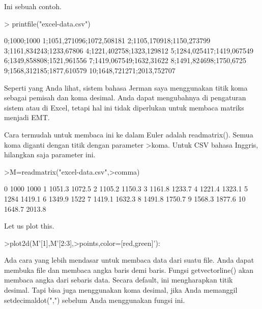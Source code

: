 \documentclass{article}
\begin{document}
\begin{eulernotebook}
\begin{eulercomment}
\begin{eulercomment}
\begin{eulercomment}
\begin{eulercomment}
\begin{eulercomment}
\begin{eulercomment}
\begin{eulercomment}
\begin{eulercomment}
\begin{eulercomment}
\begin{eulercomment}
\begin{eulercomment}
\begin{eulercomment}
\begin{eulercomment}
\begin{eulercomment}
\begin{eulercomment}
Ini sebuah contoh.
\end{eulercomment}
\begin{eulerprompt}
> printfile("excel-data.csv")
\end{eulerprompt}
\begin{euleroutput}
  0;1000;1000
  1;1051,271096;1072,508181
  2;1105,170918;1150,273799
  3;1161,834243;1233,67806
  4;1221,402758;1323,129812
  5;1284,025417;1419,067549
  6;1349,858808;1521,961556
  7;1419,067549;1632,31622
  8;1491,824698;1750,6725
  9;1568,312185;1877,610579
  10;1648,721271;2013,752707
\end{euleroutput}
\begin{eulercomment}
Seperti yang Anda lihat, sistem bahasa Jerman saya menggunakan titik
koma sebagai pemisah dan koma desimal. Anda dapat mengubahnya di
pengaturan sistem atau di Excel, tetapi hal ini tidak diperlukan untuk
membaca matriks menjadi EMT.

Cara termudah untuk membaca ini ke dalam Euler adalah readmatrix().
Semua koma diganti dengan titik dengan parameter \textgreater{}koma. Untuk CSV
bahasa Inggris, hilangkan saja parameter ini.
\end{eulercomment}
\begin{eulerprompt}
>M=readmatrix("excel-data.csv",>comma)
\end{eulerprompt}
\begin{euleroutput}
          0      1000      1000 
          1    1051.3    1072.5 
          2    1105.2    1150.3 
          3    1161.8    1233.7 
          4    1221.4    1323.1 
          5      1284    1419.1 
          6    1349.9      1522 
          7    1419.1    1632.3 
          8    1491.8    1750.7 
          9    1568.3    1877.6 
         10    1648.7    2013.8 
\end{euleroutput}
\begin{eulercomment}
Let us plot this.
\end{eulercomment}
\begin{eulerprompt}
>plot2d(M'[1],M'[2:3],>points,color=[red,green]'):
\end{eulerprompt}
\begin{eulercomment}
Ada cara yang lebih mendasar untuk membaca data dari suatu file. Anda
dapat membuka file dan membaca angka baris demi baris. Fungsi
getvectorline() akan membaca angka dari sebaris data. Secara default,
ini mengharapkan titik desimal. Tapi bisa juga menggunakan koma
desimal, jika Anda memanggil setdecimaldot(",") sebelum Anda
menggunakan fungsi ini.


\end{eulercomment}
\end{eulercomment}
\end{eulercomment}
\end{eulercomment}
\end{eulercomment}
\end{eulercomment}
\end{eulercomment}
\end{eulercomment}
\end{eulercomment}
\end{eulercomment}
\end{eulercomment}
\end{eulercomment}
\end{eulercomment}
\end{eulercomment}
\end{eulercomment}
\end{eulernotebook}
\end{document}
